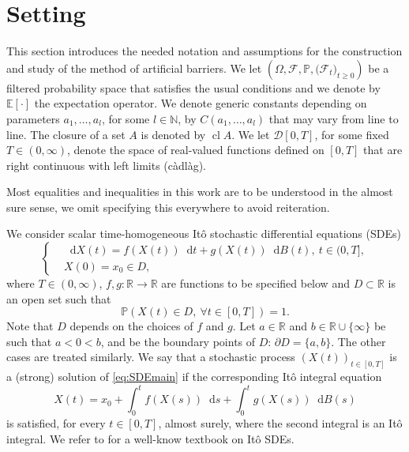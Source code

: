 \documentclass[11pt]{amsart}
\newcommand{\PP}{{\mathbb P}}
\newcommand*\diff{\mathop{}\!\mathrm{d}}
\begin{document}
{\section{Setting}\label{sec:setting}
This section introduces the needed notation and assumptions for the construction and study of the method of artificial barriers. We let $(\Omega,\mathcal{F},\mathbb{P},\bigl(\mathcal{F}_t\bigr)_{t\ge 0})$ be a filtered probability space that satisfies the usual conditions and we denote by $\mathbb{E}[\cdot]$ the expectation operator. We denote generic constants depending on parameters $a_{1},\ldots,a_{l}$, for some $l \in \mathbb{N}$, by $C(a_{1},\ldots,a_{l})$ that may vary from line to line. The closure of a set $A$ is denoted by $\operatorname{cl} A$. We let $\mathcal{D}[0,T]$, for some fixed $T \in (0,\infty)$, denote the space of real-valued functions defined on $[0,T]$ that are right continuous with left limits (càdlàg).

Most equalities and inequalities in this work are to be understood in the almost sure sense, we omit specifying this everywhere to avoid reiteration.

We consider scalar time-homogeneous Itô stochastic differential equations (SDEs)
\begin{equation}\label{eq:SDEmain}
\left\lbrace
\begin{aligned}
& \diff X(t) = f(X(t)) \diff t + g(X(t)) \diff B(t),\ t \in (0,T], \\ 
& X(0) = x_{0} \in D,
\end{aligned}
\right.
\end{equation}
where $T \in (0,\infty)$, $f,g : \mathbb{R} \to \mathbb{R}$ are functions to be specified below and $D \subset \mathbb{R}$ is an open set such that
\begin{equation*}
\PP (X(t) \in D,\ \forall t \in [0,T]) = 1.
\end{equation*}
Note that $D$ depends on the choices of $f$ and $g$. Let $a \in \mathbb{R}$ and $b \in \mathbb{R} \cup \{ \infty \}$ be such that $a < 0 < b$, and be the boundary points of $D$: $\partial D = \{ a,b \}$. The other cases are treated similarly. We say that a stochastic process $\left( X(t) \right)_{t \in [0,T]}$ is a (strong) solution of \eqref{eq:SDEmain} if the corresponding Itô integral equation
\begin{equation*}
X(t) = x_{0} + \int_{0}^{t} f(X(s)) \diff s + \int_{0}^{t} g(X(s)) \diff B(s)
\end{equation*}
is satisfied, for every $t \in [0,T]$, almost surely, where the second integral is an Itô integral. We refer to \cite{MR2001996} for a well-know textbook on Itô SDEs.

}
\end{document}
